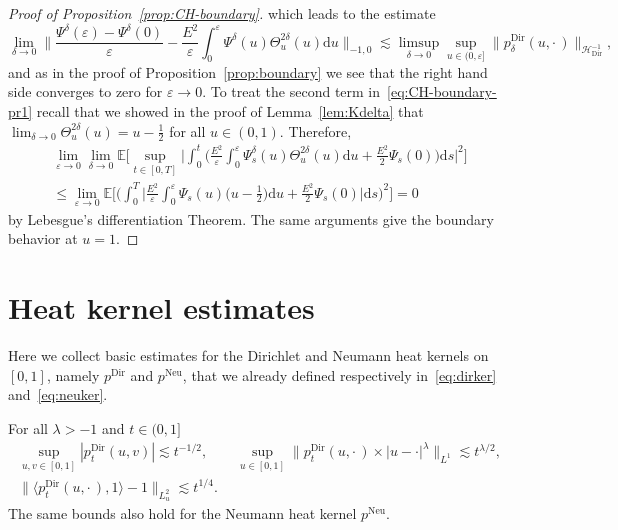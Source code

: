 \documentclass[AHL,Unicode,longabstracts]{cedram}
\DeclareMathOperator{\Dir}{Dir}
\DeclareMathOperator{\Neu}{Neu}
\newcommand{\mc}[1]{{\mathcal #1}}
\renewcommand{\mc}[1]{{\mathcal #1}}
\renewcommand{\le}{\leqslant}
\newcommand*{\dd}{\mathrm{d}}
\newcommand*{\ds}{\dd s}
\newcommand*{\du}{\dd u}
\renewcommand{\tfrac}{\frac}
\begin{document}
\begin{proof}[Proof of Proposition~\ref{prop:CH-boundary}]
which leads to the estimate
\[
\lim_{\delta \to 0} \bigg\| \frac{\Psi^\delta (\varepsilon) - \Psi^\delta(0)}{\varepsilon} - \frac{E^2}{\varepsilon} \int_0^\varepsilon \Psi^\delta(u) \Theta^{2\delta}_u(u) \du \bigg\|_{-1,0} \lesssim \limsup_{\delta \to 0} \sup_{u \in (0,\varepsilon]} \big\| p^{\Dir}_\delta(u,\cdot\,)\big\|_{\mc H_{\Dir}^{- 1}},
\]
and as in the proof of Proposition~\ref{prop:boundary} we see that the right hand side converges to zero for $\varepsilon \to 0$. To treat the second term in~\eqref{eq:CH-boundary-pr1} recall that we showed in the proof of Lemma~\ref{lem:Kdelta} that $\lim_{\delta \rightarrow 0} \Theta^{2\delta}_u (u) = u - \frac{1}{2}$ for all $u \in (0,1)$. Therefore,
\begin{multline*}
\lim_{\varepsilon \to 0} \lim_{\delta \to 0}\mathbb{E} \bigg[\sup_{t \in [0,T]} \bigg| \int_0^t \bigg(\frac{E^2}{\varepsilon} \int_0^\varepsilon \Psi^\delta_s(u) \Theta^{2\delta}_u(u) \du + \frac{E^2}{2} \Psi_s(0) \bigg) \ds \bigg|^2 \bigg] \\
\le \lim_{\varepsilon \to 0} \mathbb{E} \bigg[\bigg(\int_0^T\bigg| \frac{E^2}{\varepsilon} \int_0^\varepsilon \Psi_s(u) \big(u - \tfrac{1}{2}\big) \du + \frac{E^2}{2} \Psi_s(0)\bigg| \ds \bigg)^2 \bigg] = 0
\end{multline*}
by Lebesgue's differentiation Theorem. The same arguments give the boundary behavior at $u = 1$.
\end{proof}


\section{Heat kernel estimates}\label{app:heat-kernel}

Here we collect basic estimates for the Dirichlet and Neumann heat kernels on $[0,1]$, namely $p^{\Dir}$ and $p^{\Neu}$, that we already defined respectively in~\eqref{eq:dirker} and~\eqref{eq:neuker}.

\begin{lemm}\label{lem:Dirichlet-heat-kernel}
For all $\lambda > - 1$ and $t \in (0, 1]$
\begin{gather*}
\sup_{u, v \in [0, 1]} | p^{\Dir}_t (u, v) | \lesssim t^{- 1 / 2}, \qquad
\sup_{u \in [0, 1]} \big\| p^{\Dir}_t (u, \cdot\,)\times | u - \cdot |^{\lambda}
\big\|_{L^1} \lesssim t^{\lambda / 2}, \\
\big\| \langle p_t^{\Dir} (u, \cdot\,), 1 \rangle - 1 \big\|_{L^2_u} \lesssim t^{1 / 4}.
\end{gather*}
The same bounds also hold for the Neumann heat kernel $p^{\Neu}$.
\end{lemm}
\end{document}
